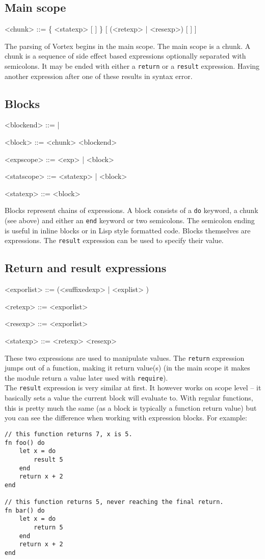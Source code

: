 \documentclass{article}
\newenvironment{bnf}
{
\begin{mdframed}
\begin{grammar}
}
{
\end{grammar}
\end{mdframed}
}
\begin{document}
\subsection{Main scope}
\begin{bnf}
<chunk> ::= \{ <statexp> [ \lit{;} ] \} [ (<retexp> | <resexp>) [ \lit{;} ] ]
\end{bnf}
The parsing of Vortex begins in the main scope. The main scope is a chunk.
A chunk is a sequence of side effect based expressions optionally separated
with semicolons. It may be ended with either a \verb|return| or a \verb|result|
expression. Having another expression after one of these results in syntax
error.
\subsection{Blocks}
\begin{bnf}
<blockend> ::=  | \lit{;;}

<block> ::=  <chunk> <blockend>

<expscope> ::= \lit{->} <exp> | <block>

<statscope> ::= \lit{->} <statexp> | <block>

<statexp> ::= <block>
\end{bnf}
Blocks represent chains of expressions. A block consists of a \verb|do|
keyword, a chunk (see above) and either an \verb|end| keyword or two
semicolons. The semicolon ending is useful in inline blocks or in
Lisp style formatted code. Blocks themselves are expressions. The \verb|result|
expression can be used to specify their value.
\subsection{Return and result expressions}
\begin{bnf}
<exporlist> ::= (<suffixedexp> | \lit{(} <explist> \lit{)})

<retexp> ::=  <exporlist>

<resexp> ::=  <exporlist>

<statexp> ::= <retexp> <resexp>
\end{bnf}
These two expressions are used to manipulate values. The \verb|return|
expression jumps out of a function, making it return value(s) (in the main
scope it makes the module return a value later used with \verb|require|).\\
The \verb|result| expression is very similar at first. It however works on
scope level -- it basically sets a value the current block will evaluate to.
With regular functions, this is pretty much the same (as a block is typically
a function return value) but you can see the difference when working with
expression blocks. For example:
\begin{lstlisting}[language=vortex]
// this function returns 7, x is 5.
fn foo() do
    let x = do
        result 5
    end
    return x + 2
end

// this function returns 5, never reaching the final return.
fn bar() do
    let x = do
        return 5
    end
    return x + 2
end
\end{lstlisting}
\end{document}
